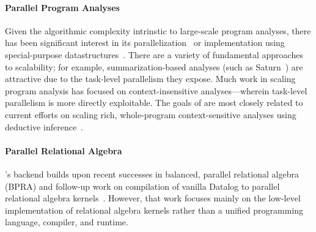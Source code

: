 




\paragraph*{Parallel Program Analyses}

Given the algorithmic complexity intrinstic to large-scale program
analyses, there has been significant interest in its
parallelization~\cite{Stefan:2011,Aiken:2007,Xie:2007,Siddiqui:2010,antoniadis2017porting,Bravenboer:2009}
or implementation using special-purpose
datastructures~\cite{Whaley:2005,Prabhu:2011,Kramer:1994,Lee:90,MendezLojo:2010}. There
are a variety of fundamental approaches to scalability; for example,
summarization-based analyses (such as
Saturn~\cite{Aiken:2007,Xie:2007}) are attractive due to the
task-level parallelism they expose. Much work in scaling program
analysis has focused on context-insensitive analyses---wherein
task-level parallelism is more directly exploitable. The goals of
\slog{} are most closely related to current efforts on scaling rich,
whole-program context-sensitive analyses using deductive
inference~\cite{antoniadis2017porting,10.1007/978-3-319-41540-6,Scholz:2016:FLP:2892208.2892226}.

\paragraph*{Parallel Relational Algebra}

\slog{}'s backend builds upon recent successes in balanced, parallel
relational algebra (BPRA) and follow-up work on compilation of vanilla
Datalog to parallel relational algebra
kernels~\cite{loadbalancingra,hipc,cc}. However, that work focuses
mainly on the low-level implementation of relational algebra kernels
rather than a unified programming language, compiler, and runtime.
